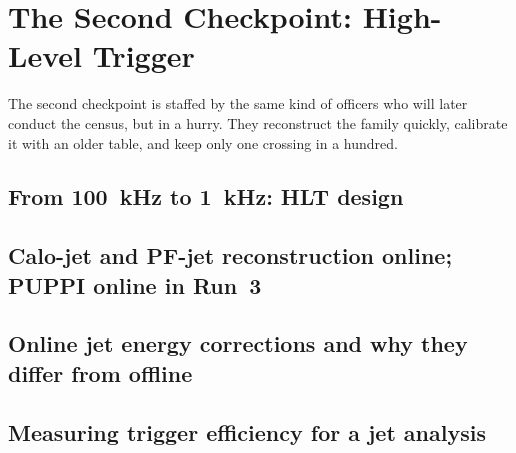 \chapter{The Second Checkpoint: High-Level Trigger}
\label{ch:second_checkpoint}

\begin{journeybox}
The second checkpoint is staffed by the same kind of officers who will later
conduct the census, but in a hurry. They reconstruct the family quickly,
calibrate it with an older table, and keep only one crossing in a hundred.
\end{journeybox}


\section{From 100~kHz to 1~kHz: HLT design}
\label{sec:second_checkpoint:from_100_khz_to_1_khz_hlt_design}

\section{Calo-jet and PF-jet reconstruction online; PUPPI online in Run~3}
\label{sec:second_checkpoint:calo_jet_and_pf_jet_reconstruction_onlin}

\section{Online jet energy corrections and why they differ from offline}
\label{sec:second_checkpoint:online_jet_energy_corrections_and_why_th}

\section{Measuring trigger efficiency for a jet analysis}
\label{sec:second_checkpoint:measuring_trigger_efficiency_for_a_jet_a}

